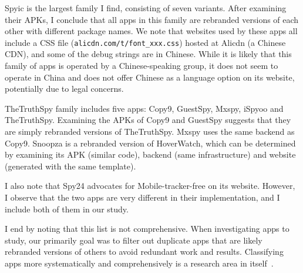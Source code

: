 Spyic is the largest family I find, consisting of seven variants.
After examining their APKs, I conclude that all apps in this family
are rebranded versions of each other with different package names.  We
note that websites used by these apps all include a CSS file
(\texttt{alicdn.com/t/font\_xxx.css}) hosted at Alicdn (a Chinese
CDN), and some of the debug strings are in Chinese.
While it is likely that this family of apps is operated
by a Chinese-speaking group, it does not seem to operate in China and
does not offer Chinese as a language option on its website,
potentially due to legal concerns.

TheTruthSpy family includes five apps: Copy9, GuestSpy, Mxspy, iSpyoo
and TheTruthSpy. Examining the APKs of Copy9 and GuestSpy suggests that
they are simply rebranded versions of TheTruthSpy. Mxspy uses the same
backend as Copy9.  Snoopza is a rebranded version of HoverWatch, which
can be determined by examining its APK (similar code), backend (same
infrastructure) and website (generated with the same
template).

I also note that Spy24 advocates for Mobile-tracker-free on its
website. However, I observe that the two apps are very different in
their implementation, and I include both of them in our study.

I end by noting that this list is not comprehensive.  When investigating apps
to study, our primarily goal was to filter out duplicate apps that are
likely rebranded versions of others to avoid redundant work and
results.  Classifying apps more systematically and comprehensively is
a research area in itself~\cite{SuarezTangil2013Dendroid,
Zhang2014Semantics, deshotels2014droidlegacy, pierazzi2020data}.


\newcommand{\hash}[1]{\texttt{#1}}

